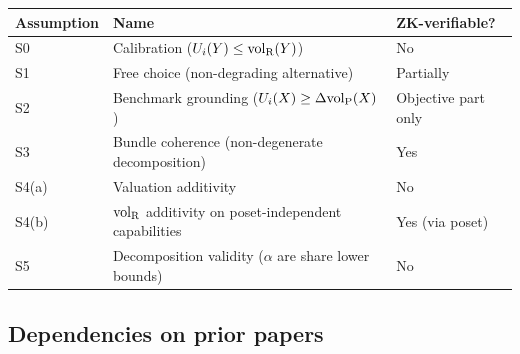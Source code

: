 \begin{center}
\small
\begin{tabular}{@{}lll@{}}
\toprule
\textbf{Assumption} & \textbf{Name} & \textbf{ZK-verifiable?} \\
\midrule
S0 & Calibration ($U_i(Y) \leq {\operatorname{vol}_{\mathrm{R}}}(Y)$) & No \\
S1 & Free choice (non-degrading alternative) & Partially \\
S2 & Benchmark grounding ($U_i(X) \geq \Delta{\operatorname{vol}_{\mathrm{P}}}(X)$)
  & Objective part only \\
S3 & Bundle coherence (non-degenerate decomposition) & Yes \\
S4(a) & Valuation additivity & No \\
S4(b) & ${\operatorname{vol}_{\mathrm{R}}}$ additivity on poset-independent capabilities
  & Yes (via poset) \\
S5 & Decomposition validity ($\alpha$ are share lower bounds)
  & No \\
\bottomrule
\end{tabular}
\end{center}

\subsection{Dependencies on prior papers}


